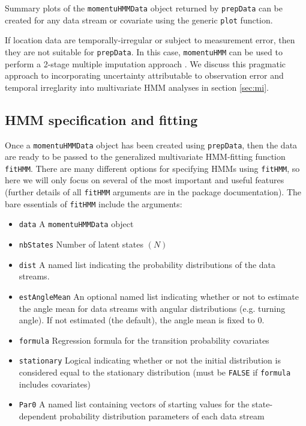 \documentclass[12pt]{article}\usepackage[]{graphicx}\usepackage[]{color}
\begin{document}
Summary plots of the \verb|momentuHMMData| object returned by \verb|prepData| can be created for any data stream or covariate using the generic \verb|plot| function.

If location data are temporally-irregular or subject to measurement error, then they are not suitable for \verb|prepData|. In this case, \verb|momentuHMM| can be used to perform a 2-stage multiple imputation approach \citep{McClintock2017}. We discuss this pragmatic approach to incorporating uncertainty attributable to observation error and temporal irreglarity into multivariate HMM analyses in section \ref{sec:mi}.

\subsection{HMM specification and fitting}
Once a \verb|momentuHMMData| object has been created using \verb|prepData|, then the data are ready to be passed to the generalized multivariate HMM-fitting function \verb|fitHMM|. There are many different options for specifying HMMs using \verb|fitHMM|, so here we will only focus on several of the most important and useful features (further details of all \verb|fitHMM| arguments are in the package documentation). The bare essentials of \verb|fitHMM| include the arguments:
\begin{itemize}
  \item{\verb|data|} A \verb|momentuHMMData| object
  \item{\verb|nbStates|} Number of latent states $(N)$
  \item{\verb|dist|} A named list indicating the probability distributions of the data streams.
  \item{\verb|estAngleMean|} An optional named list indicating whether or not to estimate the angle mean for data streams with angular distributions (e.g. turning angle). If not estimated (the default), the angle mean is fixed to 0.
  \item{\verb|formula|} Regression formula for the transition probability covariates
  \item{\verb|stationary|} Logical indicating whether or not the initial distribution is considered equal to the stationary distribution (must be \verb|FALSE| if \verb|formula| includes covariates) 
  \item{\verb|Par0|} A named list containing vectors of starting values for the state-dependent probability distribution parameters of each data stream
\end{itemize}
\end{document}
